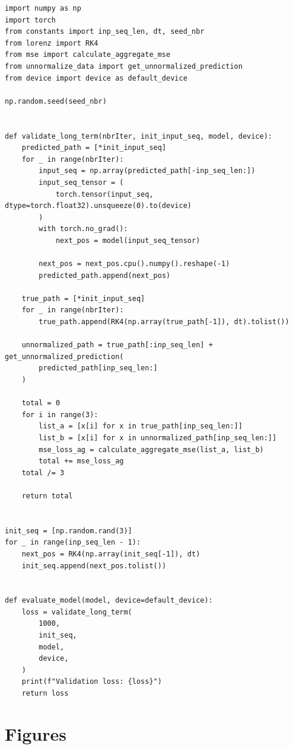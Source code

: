 \documentclass[11pt]{article}
\begin{document}
\begin{lstlisting}[caption={true\_loss.py}, label=true:loss]
import numpy as np
import torch
from constants import inp_seq_len, dt, seed_nbr
from lorenz import RK4
from mse import calculate_aggregate_mse
from unnormalize_data import get_unnormalized_prediction
from device import device as default_device

np.random.seed(seed_nbr)


def validate_long_term(nbrIter, init_input_seq, model, device):
    predicted_path = [*init_input_seq]
    for _ in range(nbrIter):
        input_seq = np.array(predicted_path[-inp_seq_len:])
        input_seq_tensor = (
            torch.tensor(input_seq, dtype=torch.float32).unsqueeze(0).to(device)
        )
        with torch.no_grad():
            next_pos = model(input_seq_tensor)

        next_pos = next_pos.cpu().numpy().reshape(-1)
        predicted_path.append(next_pos)

    true_path = [*init_input_seq]
    for _ in range(nbrIter):
        true_path.append(RK4(np.array(true_path[-1]), dt).tolist())

    unnormalized_path = true_path[:inp_seq_len] + get_unnormalized_prediction(
        predicted_path[inp_seq_len:]
    )

    total = 0
    for i in range(3):
        list_a = [x[i] for x in true_path[inp_seq_len:]]
        list_b = [x[i] for x in unnormalized_path[inp_seq_len:]]
        mse_loss_ag = calculate_aggregate_mse(list_a, list_b)
        total += mse_loss_ag
    total /= 3

    return total


init_seq = [np.random.rand(3)]
for _ in range(inp_seq_len - 1):
    next_pos = RK4(np.array(init_seq[-1]), dt)
    init_seq.append(next_pos.tolist())


def evaluate_model(model, device=default_device):
    loss = validate_long_term(
        1000,
        init_seq,
        model,
        device,
    )
    print(f"Validation loss: {loss}")
    return loss
\end{lstlisting}

\section{Figures}
\end{document}
